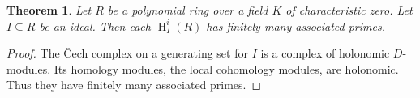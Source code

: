 \documentclass[11pt]{book}
\newtheorem{theorem}{Theorem}[chapter]
\newtheorem{definition}[theorem]{Definition}
\numberwithin{equation}{section}
\numberwithin{theorem}{chapter}
\theoremstyle{definition}
\newtheorem{example}[theorem]{Example}
\newtheorem*{basic properties}{Basic Properties}
\newtheorem*{Important Remark}{Important Remark}
\newtheorem{remark}[theorem]{Remark}
\theoremstyle{remark}
\newcommand{\CC}{\mathbb{C}}
\newcommand{\m}{\mathfrak{m}}
\renewcommand{\H}{\operatorname{H}}
\begin{document}
\begin{theorem}
	Let $R$ be a polynomial ring over a field $K$ of characteristic zero. Let $I\subseteq R$ be an ideal. Then each $\H^i_I(R)$ has finitely many associated primes.
\end{theorem}
\begin{proof}
	The \v Cech complex on a generating set for $I$ is a complex of holonomic $D$-modules. Its homology modules, the local cohomology modules, are holonomic. Thus they have finitely many associated primes.
\end{proof}

\begin{comment}

\section{$D$-simplicity and faithfulness}

The use of differential operators, like Frobenius, can still be fruitful on singular rings. We caution that much of the finer points of the machinery above fail even for finitely generated $K$-algebras: the ring $\mathrm{gr}_{\mathrm{ord}}(D_{R|K})$ may fail to be noetherian, the Bernstein filtration doesn't make sense any more, and Bernstein's inequality can fail for the order filtration. These all happen for such a nice ring as $\frac{\CC[x,y,z]}{(x^3+y^3+z^3)}$. The differential operators will still be a useful tool nonetheless. We pose a definition that is useful to this end.

\begin{definition}
	Let $A \subseteq R$ be an inclusion of rings. We say that $R$ is \emph{$D$-simple}\index{$D$-simple} if $R$ is a simple $D$-module. We warn that this depends on $A$ although it is dropped from the notation.
\end{definition}

\begin{remark}
	Suppose that $(R,\m)$ is local or graded. Then $R$ is $D$-simple if and only if for each $r\in R\smallsetminus 0$, there is some $\delta\in D_{R|A}$ such that $\delta(r)=1$. Indeed, ``if'' is clear, since any ideal of $R$ that is a $D$-submodule of $R$ must then contain 1. The other implication follows since the set of elements $\{r \in R \ | \ \delta(r)\in \m\}$ can be verified to be an ideal, and thus must be the zero ideal by hypothesis.
\end{remark}

\begin{example}
	Let $K$ be a field of characteristic zero, and $R$ a polynomial ring  over $K$. We observed earlier as a consequence of Bernstein's inequality that $R/I$ is not a $D$-module for any proper ideal $I$. It follows that $R$ is $D$-simple. 
\end{example}


\end{comment}
\end{document}
